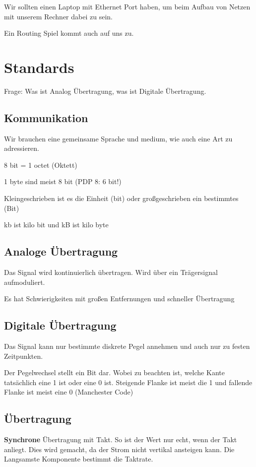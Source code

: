 \documentclass[a4paper]{article}
\begin{document}
Wir sollten einen Laptop mit Ethernet Port haben, um beim Aufbau von Netzen mit unserem Rechner dabei zu sein.

Ein Routing Spiel kommt auch auf uns zu.

\section{Standards}

Frage: Was ist Analog Übertragung, was ist Digitale Übertragung.

\subsection{Kommunikation}

Wir brauchen eine gemeinsame Sprache und medium, wie auch eine Art zu adressieren.

8 bit = 1 octet (Oktett)

1 byte sind meist 8 bit (PDP 8: 6 bit!)

Kleingeschrieben ist es die Einheit (bit) oder großgeschrieben ein bestimmtes (Bit)

kb ist kilo bit und kB ist kilo byte

\subsection{Analoge Übertragung}

Das Signal wird kontinuierlich übertragen. Wird über ein Trägersignal aufmoduliert.

Es hat Schwierigkeiten mit großen Entfernungen und schneller Übertragung

\subsection{Digitale Übertragung}

Das Signal kann nur bestimmte diskrete Pegel annehmen und auch nur zu festen Zeitpunkten.

Der Pegelwechsel stellt ein Bit dar. Wobei zu beachten ist, welche Kante tatsächlich eine 1 ist oder eine 0 ist. Steigende Flanke ist meist die 1 und fallende Flanke ist meist eine 0 (Manchester Code)

\subsection{Übertragung}

\textbf{Synchrone} Übertragung mit Takt. So ist der Wert nur echt, wenn der Takt anliegt. Dies wird gemacht, da der Strom nicht vertikal ansteigen kann. Die Langsamste Komponente bestimmt die Taktrate.
\end{document}
